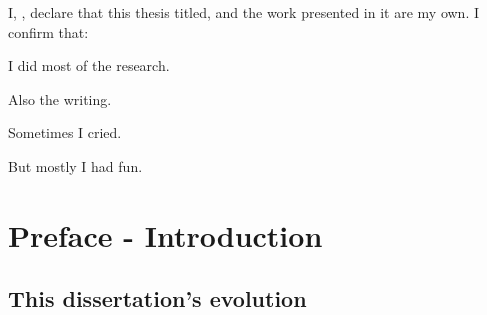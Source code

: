 \documentclass[
11pt, %
oneside, %
english, %
singlespacing, %
]{macthesis} %
\begin{document}

\begin{declaration}
\addchaptertocentry{\authorshipname}

\noindent I, \authorname, declare that this thesis titled, \emph{\ttitle} and the work presented in it are my own. I confirm that:

I did most of the research.

Also the writing.

Sometimes I cried.

But mostly I had fun.

\end{declaration}


\label{lastoffront}
\clearpage


\mainmatter %
\pagestyle{thesis}
\chapter*{Preface - Introduction}\label{preface---introduction}

\section{This dissertation's evolution}\label{this-dissertations-evolution}
\end{document}

